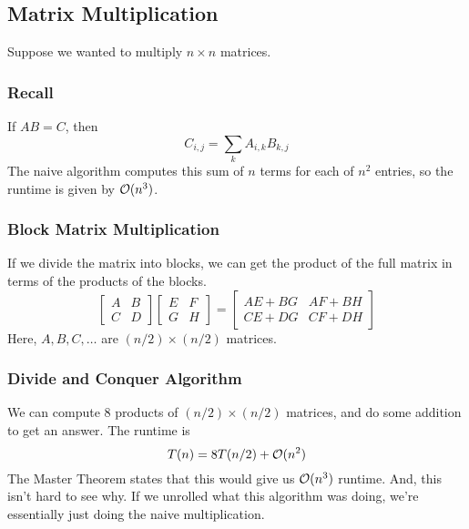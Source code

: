 \documentclass[letterpaper]{article}
\begin{document}
\subsection{Matrix Multiplication}
Suppose we wanted to multiply $n \times n$ matrices.

\subsubsection{Recall}
If $AB = C$, then 
\[C_{i, j} = \sum_{k} A_{i, k} B_{k, j}\]
The naive algorithm computes this sum of $n$ terms for each of $n^2$ entries, so the runtime is given by $\mathcal{O}(n^3)$.

\subsubsection{Block Matrix Multiplication}
If we divide the matrix into blocks, we can get the product of the full matrix in terms of the products of the blocks. 
\[
    \begin{bmatrix}
        A & B \\ C & D
    \end{bmatrix} \begin{bmatrix}
        E & F \\ G & H
    \end{bmatrix} = \begin{bmatrix}
        AE + BG & AF + BH \\ 
        CE + DG & CF + DH 
    \end{bmatrix}
\]
Here, $A, B, C, \dots$ are $(n / 2) \times (n / 2)$ matrices. 

\subsubsection{Divide and Conquer Algorithm}
We can compute 8 products of $(n / 2) \times (n / 2)$ matrices, and do some addition to get an answer. The runtime is 
\[T(n) = 8T(n / 2) + \mathcal{O}(n^2)\]
The Master Theorem states that this would give us $\mathcal{O}(n^3)$ runtime. And, this isn't hard to see why. If we unrolled what this algorithm was doing, we're essentially just doing the naive multiplication.
\end{document}
